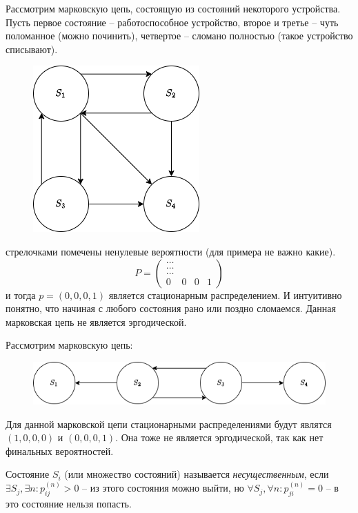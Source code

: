 \begin{ex}
  Рассмотрим марковскую цепь, состоящую из состояний некоторого устройства. Пусть первое 
  состояние -- работоспособное устройство, второе и третье -- чуть поломанное (можно починить),
  четвертое -- сломано полностью (такое устройство списывают).
  \begin{figure}[h!]
    \centering
    \includegraphics[width=0.3\linewidth]{Figures/lec2-ex2}
  \end{figure}
  
  стрелочками помечены ненулевые вероятности (для примера не важно какие).
  \[
    P = \begin{pmatrix}
      \dots \\
      \dots \\
      \dots \\
      0 & 0 & 0 & 1
    \end{pmatrix} 
  \]
  и тогда $p = (0, 0, 0, 1)$ является стационарным распределением.
  И интуитивно понятно, что начиная с любого состояния рано или поздно сломаемся.
  Данная марковская цепь не является эргодической.
\end{ex}

\begin{ex}
  Рассмотрим марковскую цепь:
  \begin{figure}[h!]
    \centering
    \includegraphics[width=0.5\linewidth]{Figures/lec2-ex3}
  \end{figure}
  
  Для данной марковской цепи стационарными распределениями будут являтся $(1, 0, 0, 0)$
  и $(0, 0, 0, 1)$. Она тоже не является эргодической, так как нет финальных вероятностей.
\end{ex}

\begin{definition}
  Состояние $S_i$ (или множество состояний) называется \emph{несущественным}, если
  $\exists S_j, \exists n : p_{ij}^{(n)} > 0$ -- из этого состояния можно выйти,
  но $\forall S_j, \forall n : p_{ji}^{(n)} = 0$ -- в это состояние нельзя попасть.
\end{definition}

